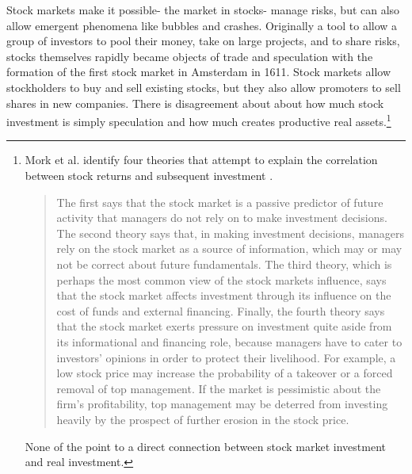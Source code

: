 


Stock markets make it possible- the market in stocks- manage risks, but can also allow emergent phenomena like bubbles and crashes.
Originally a tool to allow a group of investors to pool their money, take on large projects, and to share risks, stocks themselves rapidly became objects of trade and speculation with the formation of  the first stock market in Amsterdam in 1611. Stock markets allow stockholders to buy and sell existing stocks, but they also allow promoters  to sell shares in new companies. There is disagreement about about how much  stock investment is simply speculation and how much creates productive real assets.\footnote{Mork et al. identify four theories that attempt to explain the correlation between stock returns and subsequent investment \cite{morckStockMarketInvestment1990}. \begin{quotation}The first says that the stock market is a passive predictor of future activity that managers do not rely on to make investment decisions. The second theory says that, in making investment decisions, managers rely on the stock market as a source of information, which may or may not be correct about future fundamentals. The third theory, which is perhaps the most common view of the stock markets influence, says that the stock market affects investment through its influence on the cost of funds and external financing. Finally, the fourth theory says that the stock market exerts pressure on investment quite aside from its informational and financing role, because managers have to cater to investors' opinions in order to protect their livelihood. For example, a low stock price may increase the probability of a takeover or a forced removal of top management. If the market is pessimistic about the firm's profitability, top management may be deterred from investing heavily by the prospect of further erosion in the stock price.\end{quotation} None of the point to a direct connection between stock market investment and real investment.} %
